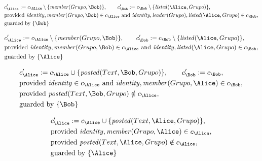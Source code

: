 \begin{align*}
&
c'_
{
\Alice
}
 := 
c_
{
\Alice
}
 \setminus 
\{
\mathit{\detokenize{
member
}}
(
Grupo
,
\Bob
)
\}
, \qquad 
c'_
{
\Bob
}
 := 
c_
{
\Bob
}
 \setminus 
\{
\mathit{\detokenize{
listed
}}
(
\Alice
,
Grupo
)
\}
,\\
&
\text{provided } 
\mathit{\detokenize{
identity
}}
,
\mathit{\detokenize{
member
}}
(
Grupo
,
\Bob
)
 \in c_
{
\Alice
}
 \text{ and } 
\mathit{\detokenize{
identity
}}
,
\mathit{\detokenize{
leader
}}
(
Grupo
)
,
\mathit{\detokenize{
listed
}}
(
\Alice
,
Grupo
)
 \in c_
{
\Bob
}
,\\
&
\text{guarded by } \{
\Bob
\}
\end{align*}

\begin{align*}
&
c'_
{
\Alice
}
 := 
c_
{
\Alice
}
 \setminus 
\{
\mathit{\detokenize{
member
}}
(
Grupo
,
\Bob
)
\}
, \qquad 
c'_
{
\Bob
}
 := 
c_
{
\Bob
}
 \setminus 
\{
\mathit{\detokenize{
listed
}}
(
\Alice
,
Grupo
)
\}
,\\
&
\text{provided } 
\mathit{\detokenize{
identity
}}
,
\mathit{\detokenize{
member
}}
(
Grupo
,
\Bob
)
 \in c_
{
\Alice
}
 \text{ and } 
\mathit{\detokenize{
identity
}}
,
\mathit{\detokenize{
listed
}}
(
\Alice
,
Grupo
)
 \in c_
{
\Bob
}
,\\
&
\text{guarded by } \{
\Alice
\}
\end{align*}

\begin{align*}
&
c'_
{
\Alice
}
 := 
c_
{
\Alice
}
 \cup 
\{
\mathit{\detokenize{
posted
}}
(
Text
,
\Bob
,
Grupo
)
\}
, \qquad 
c'_
{
\Bob
}
 := 
c_
{
\Bob
}
,\\
&
\text{provided } 
\mathit{\detokenize{
identity
}}
 \in c_
{
\Alice
}
 \text{ and } 
\mathit{\detokenize{
identity
}}
,
\mathit{\detokenize{
member
}}
(
Grupo
,
\Alice
)
 \in c_
{
\Bob
}
,\\
&
\text{provided } 
\mathit{\detokenize{
posted
}}
(
Text
,
\Bob
,
Grupo
)
 \notin c_
{
\Alice
}
,\\
&
\text{guarded by } \{
\Bob
\}
\end{align*}

\begin{align*}
&
c'_
{
\Alice
}
 := 
c_
{
\Alice
}
 \cup 
\{
\mathit{\detokenize{
posted
}}
(
Text
,
\Alice
,
Grupo
)
\}
,\\
&
\text{provided } 
\mathit{\detokenize{
identity
}}
,
\mathit{\detokenize{
member
}}
(
Grupo
,
\Alice
)
 \in c_
{
\Alice
}
,\\
&
\text{provided } 
\mathit{\detokenize{
posted
}}
(
Text
,
\Alice
,
Grupo
)
 \notin c_
{
\Alice
}
,\\
&
\text{guarded by } \{
\Alice
\}
\end{align*}

